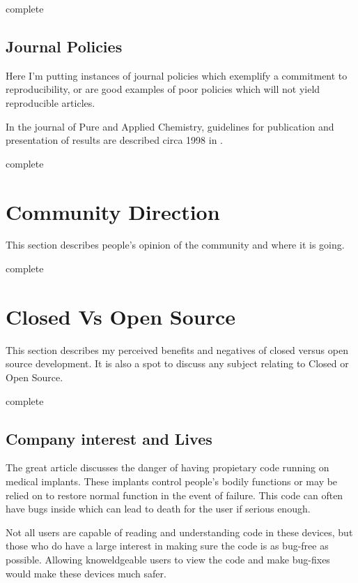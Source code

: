 \documentclass[american]{article}
\newcommand{\complete}{
	\gls{complete}
}
\begin{document}
\complete

\subsection{Journal Policies} \label{sec:policy-journals}

Here I'm putting instances of journal policies which exemplify a commitment to reproducibility, or are good examples of poor policies which will not yield reproducible articles.

In the journal of Pure and Applied Chemistry, guidelines for publication and presentation of results are described circa 1998 in \cite{pac-guidelines-publication-1998,pac-guidelines-presentation-1998}.

\complete

\section{Community Direction} \label{sec:community}

This section describes people's opinion of the community and where it is going.

\complete

\section{Closed Vs Open Source} \label{sec:closed-v-open}

This section describes my perceived benefits and negatives of closed versus open source development. It is also a spot to discuss any subject relating to Closed or Open Source.

\complete

\subsection{Company interest and Lives} \label{sec:closed-v-open-company}

The great article \cite{killed-by-code} discusses the danger of having propietary code running on medical implants. These implants control people's bodily functions or may be relied on to restore normal function in the event of failure. This code can often have bugs inside which can lead to death for the user if serious enough.

Not all users are capable of reading and understanding code in these devices, but those who do have a large interest in making sure the code is as bug-free as possible. Allowing knoweldgeable users to view the code and make bug-fixes would make these devices much safer.
\end{document}

